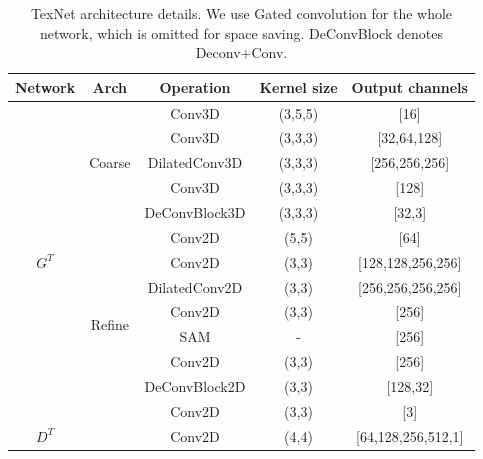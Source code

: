 \begin{table}[t]
	\caption{TexNet architecture details. We use Gated convolution for the whole network, which is omitted for space saving. DeConvBlock denotes Deconv+Conv. }\smallskip
	\scriptsize
	\centering
	{
		\smallskip\begin{tabular}{c|c|c|c|c}
			\hline\hline
			\textbf{Network} &\textbf{Arch} & \textbf{Operation} & \textbf{Kernel size} & \textbf{Output channels} \\ \hline \hline
			\multirow{13}{*}{$G^T$}	& & Conv3D  & (3,5,5) & [16]  \\ \cline{3-5}
			& & Conv3D  & (3,3,3) & [32,64,128] 
			\\ \cline{3-5}
			& Coarse 	 & DilatedConv3D  & (3,3,3) & [256,256,256]
			\\ \cline{3-5}
			&	& Conv3D  & (3,3,3) & [128]  \\ \cline{3-5}
			&	& DeConvBlock3D  & (3,3,3) & [32,3]  \\ \cline{2-5}
			& \multirow{8}{*}{Refine} & Conv2D & (5,5) & [64]\\ \cline{3-5}
			&& Conv2D & (3,3) & [128,128,256,256] \\ \cline{3-5}
			&	& DilatedConv2D & (3,3) & [256,256,256,256] \\ \cline{3-5}
			
			&& Conv2D & (3,3) & [256] \\ \cline{3-5}
			
			
			&& SAM & - & [256] \\ \cline{3-5}
			
			&& Conv2D & (3,3) & [256] \\ \cline{3-5}
			
			&& DeConvBlock2D & (3,3) & [128,32] \\ \cline{3-5}	
			
			&& Conv2D & (3,3) & [3] \\ \hline \hline
			
			$D^T$ & & Conv2D & (4,4) & [64,128,256,512,1] \\ \hline
			
		\end{tabular}
	}
	\label{tab:tex-arch}
\end{table}



